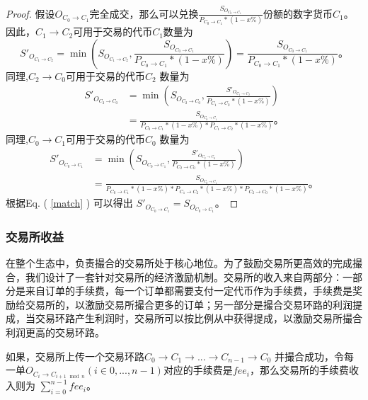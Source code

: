 \documentclass[UTF8,nofonts]{ctexart}
\newtheorem{proof}{证明} [section]
\begin{document}
\begin{proof}
假设$O_{C_{0} \rightarrow C_{1}}$完全成交，那么可以兑换$\frac{S_{O_{C_{0}\rightarrow C_{1}}}}{P_{C_{0} \rightarrow C_{1}}*(1-x\%)}$份额的数字货币$C_{1}$。因此，$C_{1} \rightarrow C_{2}$可用于交易的代币$C_{1}$数量为
$$S'_{O_{C_{1}\rightarrow C_{2}}}=\min(S_{O_{C_{1}\rightarrow C_{2}}},\frac{S_{O_{C_{0}\rightarrow C_{1}}}}{P_{C_{0} \rightarrow C_{1}}*(1-x\%)})=\frac{S_{O_{C_{0}\rightarrow C_{1}}}}{P_{C_{0} \rightarrow C_{1}}*(1-x\%)}\text{。}$$
同理,$C_{2} \rightarrow C_{0}$可用于交易的代币$C_{2}$ 数量为
\[ \begin{split}
S'_{O_{C_{2}\rightarrow C_{0}}}&=\min(S_{O_{C_{2}\rightarrow C_{0}}},\frac{S'_{O_{C_{1}\rightarrow C_{2}}}}{P_{C_{1} \rightarrow C_{2}}*(1-x\%)})\\
&=\frac{S_{O_{C_{0}\rightarrow C_{1}}}}{P_{C_{0} \rightarrow C_{1}}*(1-x\%)*P_{C_{1} \rightarrow C_{2}}*(1-x\%)}\text{。}
\end{split} \]
同理,$C_{0} \rightarrow C_{1}$可用于交易的代币$C_{0}$ 数量为
\[ \begin{split}
S'_{O_{C_{0}\rightarrow C_{1}}}&=\min(S_{O_{C_{0}\rightarrow C_{1}}},\frac{S'_{O_{C_{2}\rightarrow C_{0}}}}{P_{C_{2} \rightarrow C_{0}}*(1-x\%)})\\
&=\frac{S_{O_{C_{0}\rightarrow C_{1}}}}{P_{C_{0} \rightarrow C_{1}}*(1-x\%)*P_{C_{1} \rightarrow C_{2}}*(1-x\%)*P_{C_{2} \rightarrow C_{0}}*(1-x\%)}\text{。}
\end{split} \]
根据Eq. ( \ref{match} ) 可以得出 $S'_{O_{C_{0}\rightarrow C_{1}}}=S_{O_{C_{0}\rightarrow C_{1}}}$。
\end{proof}

\subsubsection{交易所收益\label{sec:fee}}
在整个生态中，负责撮合的交易所处于核心地位。为了鼓励交易所更高效的完成撮合，我们设计了一套针对交易所的经济激励机制。交易所的收入来自两部分：一部分是来自订单的手续费，每一个订单都需要支付一定代币作为手续费，手续费是奖励给交易所的，以激励交易所撮合更多的订单；另一部分是撮合交易环路的利润提成，当交易环路产生利润时，交易所可以按比例从中获得提成，以激励交易所撮合利润更高的交易环路。

如果，交易所上传一个交易环路$C_0 \rightarrow C_1 \rightarrow ... \rightarrow C_{n-1} \rightarrow C_{0}$ 并撮合成功，令每一单$O_{C_{i}\rightarrow C_{i+1\mod n}}$$(i\in{0,...,n-1})$对应的手续费是$fee_{i}$，那么交易所的手续费收入则为
$
\sum^{n-1}_{i=0}fee_{i}\text{。}
$
\end{document}
